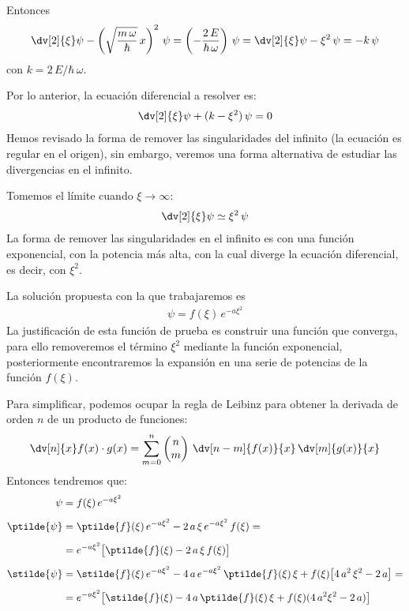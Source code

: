 Entonces
\begin{align*}
\dv[2]{\xi} \psi -  \left( \sqrt{\dfrac{m \, \omega}{\hbar}} \, x \right)^{2} \, \psi = \left( - \dfrac{2 \, E}{\hbar \, \omega} \right) \, \psi = \dv[2]{\xi} \psi - \xi^{2} \, \psi = - k \, \psi
\end{align*}
con $k = 2 \, E / \hbar \, \omega$.
\par
Por lo anterior, la ecuación diferencial a resolver es:
\begin{align*}
\dv[2]{\xi} \psi + (k - \xi^{2}) \, \psi = 0
\end{align*}
Hemos revisado la forma de remover las singularidades del infinito (la ecuación es regular en el origen), sin embargo, veremos una forma alternativa de estudiar las divergencias en el infinito.
\par
Tomemos el límite cuando $\xi \to \infty$:
\begin{align*}
\dv[2]{\xi} \psi \simeq \xi^{2} \, \psi
\end{align*}
La forma de remover las singularidades en el infinito es con una función exponencial, con la potencia más alta, con la cual diverge la ecuación diferencial, es decir, con $\xi^{2}$.
\par
La solución propuesta con la que trabajaremos es
\begin{align*}
\psi = f(\xi) \, e^{-a \xi^{2}}
\end{align*}
La justificación de esta función de prueba es construir una función que converga, para ello removeremos el término $\xi^{2}$ mediante la función exponencial, posteriormente encontraremos la expansión en una serie de potencias de la función $f(\xi)$.
\par
Para simplificar, podemos ocupar la regla de Leibinz para obtener la derivada de orden $n$ de un producto de funciones:
\begin{align*}
\dv[n]{x} f(x) \cdot g(x) = \sum_{m=0}^{n} \begin{pmatrix}
n \\ m \end{pmatrix} \, \dv[n-m]{f(x)}{x}  \, \dv[m]{g(x)}{x}
\end{align*}
Entonces tendremos que:
\begin{align*}
\psi &= f(\xi) \, e^{-a \xi^{2}} \\[0.5em]
\ptilde{\psi} &= \ptilde{f}(\xi) \, e^{-a \xi^{2}} - 2 \, a \, \xi  \, e^{-a \xi^{2}} \, f(\xi) = \\[0.5em]
&= e^{-a \xi^{2}} \big[ \ptilde{f}(\xi) -  2 \, a \, \xi \, f(\xi) \big] \\[0.5em]
\stilde{\psi} &= \stilde{f}(\xi) \, e^{-a \xi^{2}} - 4 \, a \, e^{-a \xi^{2}} \, \ptilde{f}(\xi) \, \xi + f(\xi) \big[ 4 \, a^{2} \, \xi^{2} - 2 \, a \big] = \\[0.5em]
&= e^{-a \xi^{2}} \big[ \stilde{f}(\xi) - 4 \, a \, \ptilde{f}(\xi) \, \xi + f(\xi) (4 \, a^{2} \xi^{2} - 2 \, a) \big]
\end{align*}
